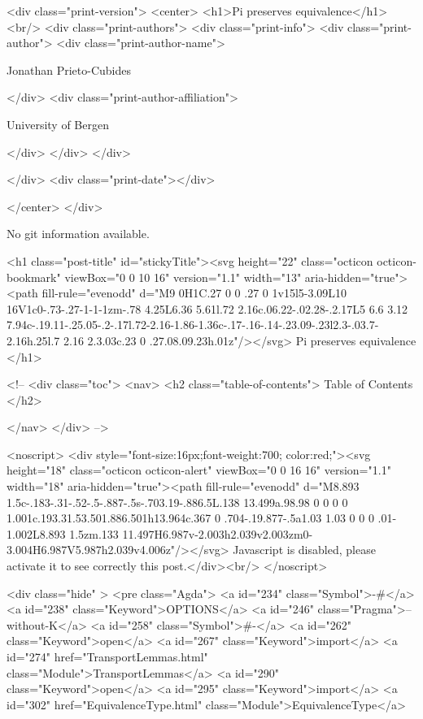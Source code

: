   <div class="print-version">
    <center>
      <h1>Pi preserves equivalence</h1><br/>
        <div class="print-authors">
          <div class="print-info">
            <div class="print-author">
              <div class="print-author-name">
                
                  Jonathan Prieto-Cubides
                
              </div>
              <div class="print-author-affiliation">
                
                  University of Bergen
                
                </div>
            </div>
          </div>
          
          
        </div>
        <div class="print-date"></div>
        
        
    </center>
  </div>

  
  No git information available.
  
  <h1 class="post-title" id="stickyTitle"><svg height="22" class="octicon octicon-bookmark" viewBox="0 0 10 16" version="1.1" width="13" aria-hidden="true"><path fill-rule="evenodd" d="M9 0H1C.27 0 0 .27 0 1v15l5-3.09L10 16V1c0-.73-.27-1-1-1zm-.78 4.25L6.36 5.61l.72 2.16c.06.22-.02.28-.2.17L5 6.6 3.12 7.94c-.19.11-.25.05-.2-.17l.72-2.16-1.86-1.36c-.17-.16-.14-.23.09-.23l2.3-.03.7-2.16h.25l.7 2.16 2.3.03c.23 0 .27.08.09.23h.01z"/></svg> Pi preserves equivalence
  </h1>

  <!-- 
  <div class="toc">
    <nav>
    <h2 class="table-of-contents"> Table of Contents </h2>
      

    </nav>
  </div>
   -->

  <noscript>
  <div style="font-size:16px;font-weight:700; color:red;"><svg height="18" class="octicon octicon-alert" viewBox="0 0 16 16" version="1.1" width="18" aria-hidden="true"><path fill-rule="evenodd" d="M8.893 1.5c-.183-.31-.52-.5-.887-.5s-.703.19-.886.5L.138 13.499a.98.98 0 0 0 0 1.001c.193.31.53.501.886.501h13.964c.367 0 .704-.19.877-.5a1.03 1.03 0 0 0 .01-1.002L8.893 1.5zm.133 11.497H6.987v-2.003h2.039v2.003zm0-3.004H6.987V5.987h2.039v4.006z"/></svg> Javascript is disabled, please activate it to see correctly this post.</div><br/>
  </noscript>

  <div class="hide" >
<pre class="Agda">
<a id="234" class="Symbol">{-#</a> <a id="238" class="Keyword">OPTIONS</a> <a id="246" class="Pragma">--without-K</a> <a id="258" class="Symbol">#-}</a>
<a id="262" class="Keyword">open</a> <a id="267" class="Keyword">import</a> <a id="274" href="TransportLemmas.html" class="Module">TransportLemmas</a>
<a id="290" class="Keyword">open</a> <a id="295" class="Keyword">import</a> <a id="302" href="EquivalenceType.html" class="Module">EquivalenceType</a>


